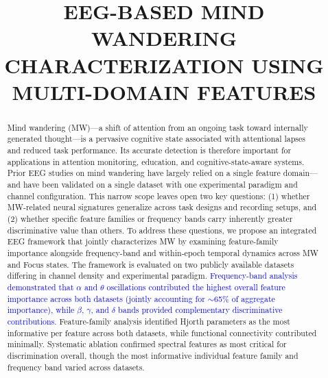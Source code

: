 \documentclass[conference]{IEEEtran}
\begin{document}
\title{EEG-BASED MIND WANDERING CHARACTERIZATION USING MULTI-DOMAIN FEATURES\vspace{-4mm}
}

\author{
}
\maketitle 
\begin{abstract}
Mind wandering (MW)---a shift of attention from an ongoing task toward internally generated thought---is a pervasive cognitive state associated with attentional lapses and reduced task performance. Its accurate detection is therefore important for applications in attention monitoring, education, and cognitive-state-aware systems. Prior EEG studies on mind wandering have largely relied on a single feature domain---and have been validated on a single dataset with one experimental paradigm and channel configuration. This narrow scope leaves open two key questions: (1) whether MW-related neural signatures generalize across task designs and recording setups, and (2) whether specific feature families or frequency bands carry inherently greater discriminative value than others. To address these questions, we propose an integrated EEG framework that jointly characterizes MW by examining feature-family importance alongside frequency-band and within-epoch temporal dynamics across MW and Focus states. The framework is evaluated on two publicly available datasets differing in channel density and experimental paradigm. \textcolor{blue}{Frequency-band analysis demonstrated that $\alpha$ and $\theta$ oscillations contributed the highest overall feature importance across both datasets (jointly accounting for $\sim$65\% of aggregate importance), while $\beta$, $\gamma$, and $\delta$ bands provided complementary discriminative contributions.} Feature-family analysis identified Hjorth parameters as the most informative per feature across both datasets, while functional connectivity contributed minimally. Systematic ablation confirmed spectral features as most critical for discrimination overall, though the most informative individual feature family and frequency band varied across datasets.

\end{abstract}
\end{document}
